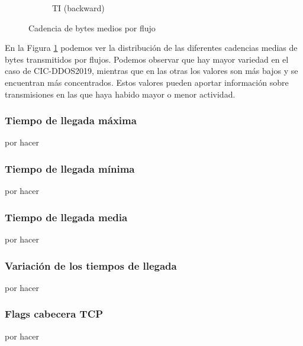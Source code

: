 \begin{figure}[H]
\begin{subfigure}[b]{0.26\textwidth}
        \caption{TI (backward)}
    \end{subfigure}
    \hfill
       \caption{Cadencia de bytes medios por flujo}
       \label{fig:packet_pincer_bytes_s}
\end{figure}

En la Figura \ref{fig:packet_pincer_bytes_s} podemos ver la distribución de las diferentes cadencias medias de bytes transmitidos por flujos. Podemos observar que hay mayor variedad en el caso de CIC-DDOS2019, mientras que en las otras los valores son más bajos y se encuentran más concentrados. Estos valores pueden aportar información sobre transmisiones en las que haya habido mayor o menor actividad.

\subsubsection{Tiempo de llegada máxima}

por hacer

\subsubsection{Tiempo de llegada mínima}

por hacer

\subsubsection{Tiempo de llegada media}

por hacer

\subsubsection{Variación de los tiempos de llegada}

por hacer

\subsubsection{Flags cabecera TCP}

por hacer

